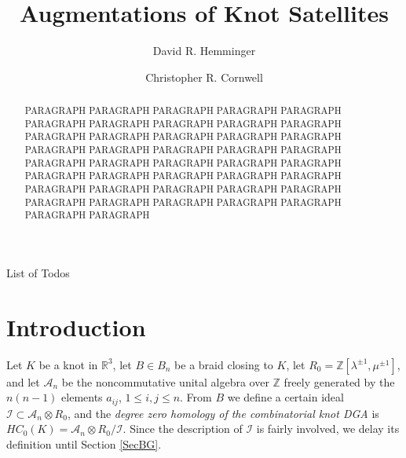 \documentclass[11pt]{amsart}
\makeatletter
\def\Z{{\mathbb Z}}
\def\R{{\mathbb R}}
\def\A{{\mathcal A}}
\def\listtodoname{List of Todos}
\def\listoftodos{\@starttoc{tdo}\listtodoname}
\makeatother
\begin{document}
\listoftodos
\newpage





\title{Augmentations of Knot Satellites}

\author{David R. Hemminger}
\author{Christopher R. Cornwell}

\begin{abstract}
PARAGRAPH PARAGRAPH PARAGRAPH PARAGRAPH PARAGRAPH PARAGRAPH PARAGRAPH PARAGRAPH PARAGRAPH PARAGRAPH PARAGRAPH PARAGRAPH PARAGRAPH PARAGRAPH PARAGRAPH PARAGRAPH PARAGRAPH PARAGRAPH PARAGRAPH PARAGRAPH PARAGRAPH PARAGRAPH PARAGRAPH PARAGRAPH PARAGRAPH PARAGRAPH PARAGRAPH PARAGRAPH PARAGRAPH PARAGRAPH PARAGRAPH PARAGRAPH PARAGRAPH PARAGRAPH PARAGRAPH PARAGRAPH PARAGRAPH PARAGRAPH PARAGRAPH PARAGRAPH PARAGRAPH PARAGRAPH
\end{abstract}

\maketitle

\section{Introduction}
Let $K$ be a knot in $\R^3$, let $B\in B_n$ be a braid closing to $K$, let $R_0 = \Z[\lambda^{\pm 1},\mu^{\pm 1}]$, and let $\A_n$ be the noncommutative unital algebra over $\Z$ freely generated by the $n(n-1)$ elements $a_{ij}$, $1\le i,j\le n$.  From $B$ we define a certain ideal $\mathcal{I}\subset \A_n\otimes R_0$, and the \emph{degree zero homology of the combinatorial knot DGA} is $HC_0(K) = \A_n\otimes R_0/\mathcal{I}$.  Since the description of $\mathcal{I}$ is fairly involved, we delay its definition until Section \ref{SecBG}.
\end{document}
